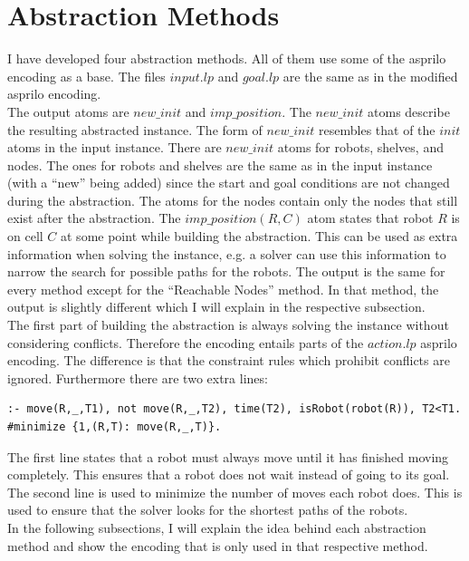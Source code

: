 \documentclass[runningheads]{llncs}
\begin{document}
\section{Abstraction Methods}
I have developed four abstraction methods. All of them use some of the asprilo encoding as a base. The files $input.lp$ and $goal.lp$ are the same as in the modified asprilo encoding. \\
The output atoms are $new\_init$ and $imp\_position$. The $new\_init$ atoms describe the resulting abstracted instance. The form of $new\_init$ resembles that of the $init$ atoms in the input instance. There are $new\_init$ atoms for robots, shelves, and nodes. The ones
for robots and shelves are the same as in the input instance (with a ``new'' being added) since the start and goal conditions are not changed during the abstraction. The atoms for the nodes contain only the nodes that still exist after the abstraction. The $imp\_position(R, C)$ atom states that robot $R$ is on cell $C$ at some point while building the abstraction. This can be used as extra information when solving the instance, e.g. a solver can use this information to narrow the search for possible paths for the robots. The output is the same for every method except for the ``Reachable Nodes'' method. In that method, the output is slightly different which I will explain in the respective subsection. \\
The first part of building the abstraction is always solving the instance without considering conflicts. Therefore the encoding entails parts of the $action.lp$ asprilo encoding. The difference is that the constraint rules which prohibit conflicts are ignored.
Furthermore there are two extra lines:
\begin{verbatim}
:- move(R,_,T1), not move(R,_,T2), time(T2), isRobot(robot(R)), T2<T1.
#minimize {1,(R,T): move(R,_,T)}.
\end{verbatim}
The first line states that a robot must always move until it has finished moving completely. This ensures that a robot does not wait instead of going to its goal. \\
The second line is used to minimize the number of moves each robot does. This is used to ensure that the solver looks for the shortest paths of the robots. \\
In the following subsections, I will explain the idea behind each abstraction method and show the encoding that is only used in that respective method. 
\end{document}
